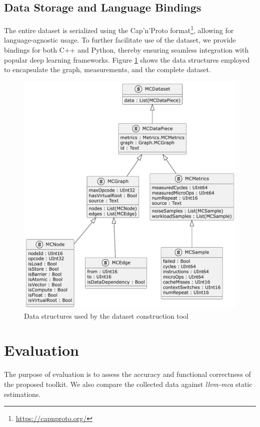 \subsection{Data Storage and Language Bindings}

The entire dataset is serialized using the Cap'n'Proto format\footnote{\url{https://capnproto.org/}},
allowing for language-agnostic usage. To further facilitate use of the dataset, we provide bindings for
both C++ and Python, thereby ensuring seamless integration with popular deep learning frameworks. Figure
\ref{fig:datastruct} shows the data structures employed to encapsulate the graph, measurements, and the
complete dataset.

\begin{figure}[h]
  \centering
  \includegraphics[width=0.9\columnwidth]{data_structures}
  \caption{Data structures used by the dataset construction tool}
  \label{fig:datastruct}
\end{figure}

\section{Evaluation}

The purpose of evaluation is to assess the accuracy and functional correctness of the proposed toolkit.
We also compare the collected data against \textit{llvm-mca} static estimations.

